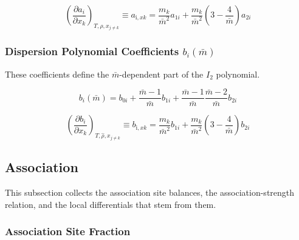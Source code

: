 \documentclass[12pt, letterpaper]{article}
\begin{document}
\begin{equation}
    \left(\frac{\partial a_{i}}{\partial x_{k}}\right)_{T,\hat{\rho},x_{j\neq k}}
    \equiv a_{\mathrm{i},xk}
    =\frac{m_{k}}{\bar{m}^{2}}a_{1i}+\frac{m_{k}}{\bar{m}^{2}}\left(3-\frac{4}{\bar{m}}\right)a_{2i}
    \label{eq:a_i_xk}
\end{equation}

\subsubsection{Dispersion Polynomial Coefficients \(b_i(\bar m)\)}

These coefficients define the \(\bar m\)-dependent part of the \(I_2\) polynomial.

\begin{equation}
    b_{i}(\bar{m})=b_{0 i}+\frac{\bar{m}-1}{\bar{m}} b_{1 i}+\frac{\bar{m}-1}{\bar{m}} \frac{\bar{m}-2}{\bar{m}} b_{2 i}
    \label{eq:b_i_mbar}
\end{equation}


\begin{equation}
    \left(\frac{\partial b_{i}}{\partial x_{k}}\right)_{T,\hat{\rho},x_{j\neq k}}
    \equiv b_{\mathrm{i},xk}
    =\frac{m_{k}}{\bar{m}^{2}}b_{1i}+\frac{m_{k}}{\bar{m}^{2}}\left(3-\frac{4}{\bar{m}}\right)b_{2i}
    \label{eq:b_i_xk}
\end{equation}

\subsection{Association}
\label{sec:association}

This subsection collects the association site balances, the association-strength relation, and the local differentials that stem from them.

\subsubsection{Association Site Fraction}
\end{document}

